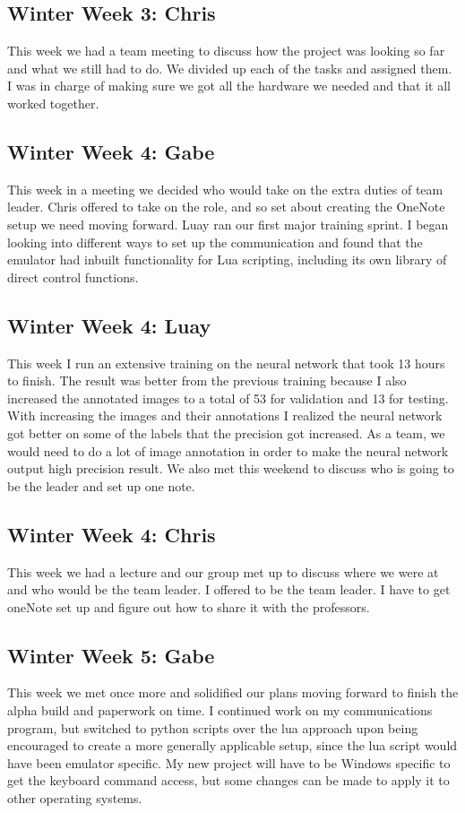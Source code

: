 \documentclass[onecolumn, draftclsnofoot,10pt, compsoc]{IEEEtran}
\begin{document}
\subsection{Winter Week 3: Chris}
This week we had a team meeting to discuss how the project was looking so far and what we still had to do. We divided up each of the tasks and assigned them. I was in charge of making sure we got all the hardware we needed and that it all worked together.
\subsection{Winter Week 4: Gabe}
This week in a meeting we decided who would take on the extra duties of team leader. Chris offered to take on the role, and so set about creating the OneNote setup we need moving forward. Luay ran our first major training sprint. I began looking into different ways to set up the communication and found that the emulator had inbuilt functionality for Lua scripting, including its own library of direct control functions.
\subsection{Winter Week 4: Luay}
This week I run an extensive training on the neural network that took 13 hours to finish. The result was better from the previous training because I also increased the annotated images to a total of 53 for validation and 13 for testing. With increasing the images and their annotations I realized the neural network got better on some of the labels that the precision got increased. As a team, we would need to do a lot of image annotation in order to make the neural network output high precision result. We also met this weekend to discuss who is going to be the leader and set up one note.
\subsection{Winter Week 4: Chris}
This week we had a lecture and our group met up to discuss where we were at and who would be the team leader. I offered to be the team leader. I have to get oneNote set up and figure out how to share it with the professors.
\subsection{Winter Week 5: Gabe}
This week we met once more and solidified our plans moving forward to finish the alpha build and paperwork on time. I continued work on my communications program, but switched to python scripts over the lua approach upon being encouraged to create a more generally applicable setup, since the lua script would have been emulator specific. My new project will have to be Windows specific to get the keyboard command access, but some changes can be made to apply it to other operating systems.
\end{document}
